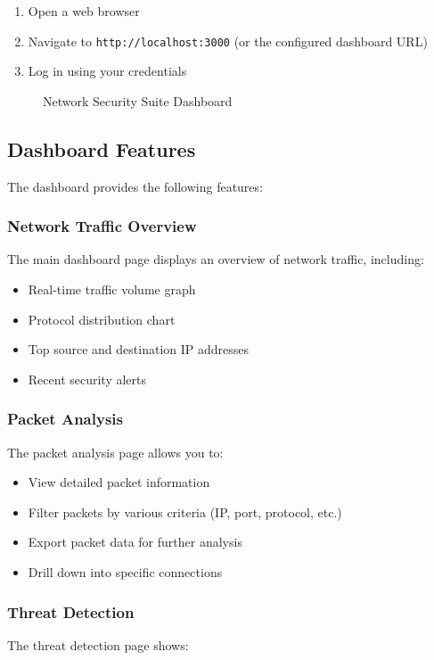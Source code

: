 \begin{enumerate}
    \item Open a web browser
    \item Navigate to \texttt{http://localhost:3000} (or the configured dashboard URL)
    \item Log in using your credentials
\end{enumerate}

\begin{figure}[H]
    \centering

    \caption{Network Security Suite Dashboard}
    \label{fig:dashboard}
\end{figure}

\subsection{Dashboard Features}
The dashboard provides the following features:

\subsubsection{Network Traffic Overview}
The main dashboard page displays an overview of network traffic, including:

\begin{itemize}
    \item Real-time traffic volume graph
    \item Protocol distribution chart
    \item Top source and destination IP addresses
    \item Recent security alerts
\end{itemize}

\subsubsection{Packet Analysis}
The packet analysis page allows you to:

\begin{itemize}
    \item View detailed packet information
    \item Filter packets by various criteria (IP, port, protocol, etc.)
    \item Export packet data for further analysis
    \item Drill down into specific connections
\end{itemize}

\subsubsection{Threat Detection}
The threat detection page shows:

